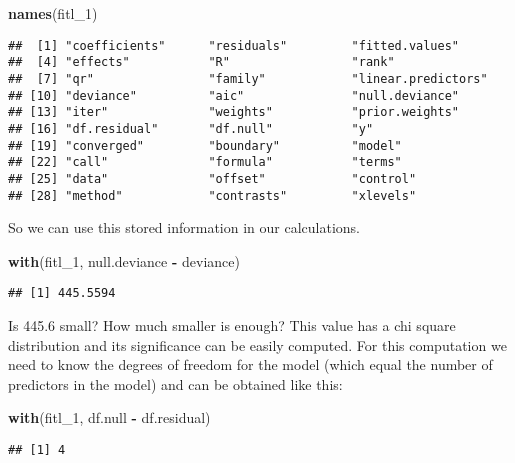 \documentclass[
]{book}
\newenvironment{Shaded}{\begin{snugshade}}{\end{snugshade}}
\newcommand{\FunctionTok}[1]{\textcolor[rgb]{0.13,0.29,0.53}{\textbf{#1}}}
\newcommand{\NormalTok}[1]{#1}
\newcommand{\SpecialCharTok}[1]{\textcolor[rgb]{0.81,0.36,0.00}{\textbf{#1}}}
\begin{document}
\begin{Shaded}
\begin{Highlighting}[]
\FunctionTok{names}\NormalTok{(fitl\_1)}
\end{Highlighting}
\end{Shaded}

\begin{verbatim}
##  [1] "coefficients"      "residuals"         "fitted.values"    
##  [4] "effects"           "R"                 "rank"             
##  [7] "qr"                "family"            "linear.predictors"
## [10] "deviance"          "aic"               "null.deviance"    
## [13] "iter"              "weights"           "prior.weights"    
## [16] "df.residual"       "df.null"           "y"                
## [19] "converged"         "boundary"          "model"            
## [22] "call"              "formula"           "terms"            
## [25] "data"              "offset"            "control"          
## [28] "method"            "contrasts"         "xlevels"
\end{verbatim}

So we can use this stored information in our calculations.

\begin{Shaded}
\begin{Highlighting}[]
\FunctionTok{with}\NormalTok{(fitl\_1, null.deviance }\SpecialCharTok{{-}}\NormalTok{ deviance)}
\end{Highlighting}
\end{Shaded}

\begin{verbatim}
## [1] 445.5594
\end{verbatim}

Is 445.6 small? How much smaller is enough? This value has a chi square distribution and its significance can be easily computed. For this computation we need to know the degrees of freedom for the model (which equal the number of predictors in the model) and can be obtained like this:

\begin{Shaded}
\begin{Highlighting}[]
\FunctionTok{with}\NormalTok{(fitl\_1, df.null }\SpecialCharTok{{-}}\NormalTok{ df.residual)}
\end{Highlighting}
\end{Shaded}

\begin{verbatim}
## [1] 4
\end{verbatim}
\end{document}
